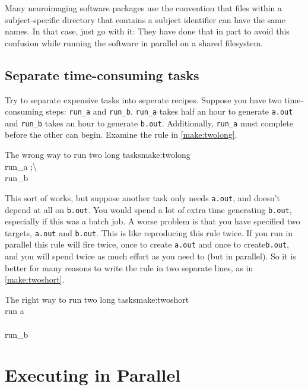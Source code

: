 Many neuroimaging software packages use the convention that files within a subject-specific directory that contains a subject identifier can have the same names. In that case, just go with it: They have done that in part to avoid this confusion while running the software in parallel on a shared filesystem.

\subsection{Separate time-consuming tasks}

Try to separate expensive tasks into seperate recipes. Suppose you have two time-consuming steps: \texttt{run_a} and \texttt{run_b}. \texttt{run_a} takes half an hour to generate \texttt{a.out} and \texttt{run_b} takes an hour to generate \texttt{b.out}. Additionally, \texttt{run_a} must complete before the other can begin. Examine the rule in \autoref{make:twolong}.
\begin{make}{The wrong way to run two long tasks}{make:twolong}
	 \\
	\tab run_a ;\textbackslash \\
	\tab run_b
\end{make}

This sort of works, but suppose another task only needs \texttt{a.out}, and doesn't depend at all on \texttt{b.out}. You would spend a lot of extra time generating \texttt{b.out}, especially if this was a batch job. A worse problem is that you have specified two targets, \texttt{a.out} and \texttt{b.out}. This is like reproducing this rule twice. If you run in parallel this rule will fire twice, once to create \texttt{a.out} and once to create\texttt{b.out}, and you will spend twice as much effort as you need to (but in parallel).  So it is better for many reasons to write the rule in two separate lines, as in \autoref{make:twoshort}.

\begin{make}{The right way to run two long tasks}{make:twoshort}
	 \\
	\tab run a \\
	
	 \\
	\tab run_b
\end{make}

\section{Executing in Parallel}
\label{sec:gridengine}
